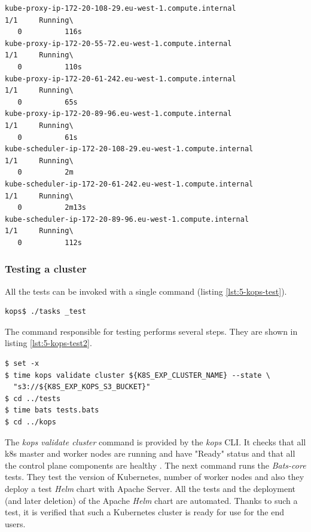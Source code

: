 \begin{lstlisting}[basicstyle=\scriptsize,xleftmargin=0cm,label=lst:5-kops-get-pods,caption={Kubernetes control plane components, \textit{High Availability}}]
kube-proxy-ip-172-20-108-29.eu-west-1.compute.internal                1/1     Running\
   0          116s
kube-proxy-ip-172-20-55-72.eu-west-1.compute.internal                 1/1     Running\
   0          110s
kube-proxy-ip-172-20-61-242.eu-west-1.compute.internal                1/1     Running\
   0          65s
kube-proxy-ip-172-20-89-96.eu-west-1.compute.internal                 1/1     Running\
   0          61s
kube-scheduler-ip-172-20-108-29.eu-west-1.compute.internal            1/1     Running\
   0          2m
kube-scheduler-ip-172-20-61-242.eu-west-1.compute.internal            1/1     Running\
   0          2m13s
kube-scheduler-ip-172-20-89-96.eu-west-1.compute.internal             1/1     Running\
   0          112s
\end{lstlisting}

\subsubsection{Testing a cluster}
\label{kops-testing}
All the tests can be invoked with a single command (listing \ref{lst:5-kops-test}).
\begin{lstlisting}[basicstyle=\scriptsize,xleftmargin=0cm,label=lst:5-kops-test,caption={Testing a \textit{kops} cluster}]
kops$ ./tasks _test
\end{lstlisting}

The command responsible for testing performs several steps. They are shown in listing \ref{lst:5-kops-test2}.
\begin{lstlisting}[basicstyle=\scriptsize,xleftmargin=0cm,label=lst:5-kops-test2,caption={Testing a \textit{kops} cluster - deeper dive}]
$ set -x
$ time kops validate cluster ${K8S_EXP_CLUSTER_NAME} --state \
  "s3://${K8S_EXP_KOPS_S3_BUCKET}"
$ cd ../tests
$ time bats tests.bats
$ cd ../kops
\end{lstlisting}

The \textit{kops validate cluster} command is provided by the \textit{kops} CLI. It checks that all k8s master and worker nodes are running and have "Ready" status and that all the control plane components are healthy \cite{online-kops-valid}. The next command runs the \textit{Bats-core} tests. They test the version of Kubernetes, number of worker nodes and also they deploy a test \textit{Helm} chart with Apache Server. All the tests and the deployment (and later deletion) of the Apache \textit{Helm} chart are automated.  Thanks to such a test, it is verified that such a Kubernetes cluster is ready for use for the end users.

